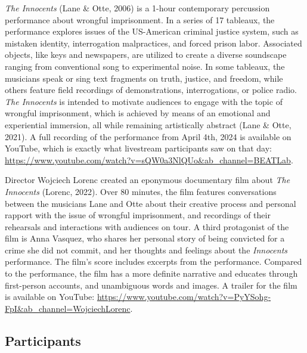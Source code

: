 \documentclass[
  man,floatsintext]{apa6}
\begin{document}
\textit{The Innocents} (Lane \& Otte, 2006) is a 1-hour contemporary percussion performance about wrongful imprisonment. In a series of 17 tableaux, the performance explores issues of the US-American criminal justice system, such as mistaken identity, interrogation malpractices, and forced prison labor. Associated objects, like keys and newspapers, are utilized to create a diverse soundscape ranging from conventional song to experimental noise. In some tableaux, the musicians speak or sing text fragments on truth, justice, and freedom, while others feature field recordings of demonstrations, interrogations, or police radio. \textit{The Innocents} is intended to motivate audiences to engage with the topic of wrongful imprisonment, which is achieved by means of an emotional and experiential immersion, all while remaining artistically abstract (Lane \& Otte, 2021). A full recording of the performance from April 4th, 2024 is available on YouTube, which is exactly what livestream participants saw on that day: \url{https://www.youtube.com/watch?v=sQW0a3NlQUo&ab_channel=BEATLab}.

Director Wojciech Lorenc created an eponymous documentary film about \textit{The Innocents} (Lorenc, 2022). Over 80 minutes, the film features conversations between the musicians Lane and Otte about their creative process and personal rapport with the issue of wrongful imprisonment, and recordings of their rehearsals and interactions with audiences on tour. A third protagonist of the film is Anna Vasquez, who shares her personal story of being convicted for a crime she did not commit, and her thoughts and feelings about the \textit{Innocents} performance. The film's score includes excerpts from the performance. Compared to the performance, the film has a more definite narrative and educates through first-person accounts, and unambiguous words and images. A trailer for the film is available on YouTube: \url{https://www.youtube.com/watch?v=PyYSohg-FpI&ab_channel=WojciechLorenc}.

\subsection{Participants}\label{participants}
\end{document}
